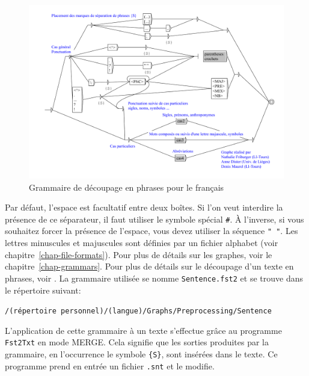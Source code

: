 \begin{figure}[!h]
\begin{center}
\includegraphics[width=15cm]{resources/img/fig2-10.pdf}
\caption{Grammaire de découpage en phrases pour le français
\label{fig-example-sentence-splitting}}
\end{center}
\end{figure}

\bigskip
\noindent Par défaut, l’espace est facultatif entre deux boîtes. Si l’on veut interdire la présence
de ce séparateur, il faut utiliser le symbole spécial \verb+#+. À l’inverse, si vous souhaitez
forcer la présence de l’espace, vous devez utiliser la séquence \verb+" "+. Les lettres minuscules
et majuscules sont définies par un fichier alphabet
(voir chapitre~\ref{chap-file-formats}). Pour plus de détails sur les graphes,
voir le chapitre~\ref{chap-grammars}. Pour plus de détails sur le découpage d’un texte en phrases,
voir \cite{ameliorer-decoupage-en-phrases}. La grammaire utilisée se nomme \verb+Sentence.fst2+ et
se trouve dans le répertoire suivant:

\bigskip
\verb+/(répertoire personnel)/(langue)/Graphs/Preprocessing/Sentence+

\bigskip
\noindent L’application de cette grammaire à un texte s’effectue grâce au programme \verb+Fst2Txt+
 en mode MERGE. 
Cela signifie que les sorties produites par la grammaire, en l’occurrence le symbole \verb+{S}+,
sont insérées dans le texte. Ce programme prend en entrée un fichier \verb+.snt+ et le modifie.


